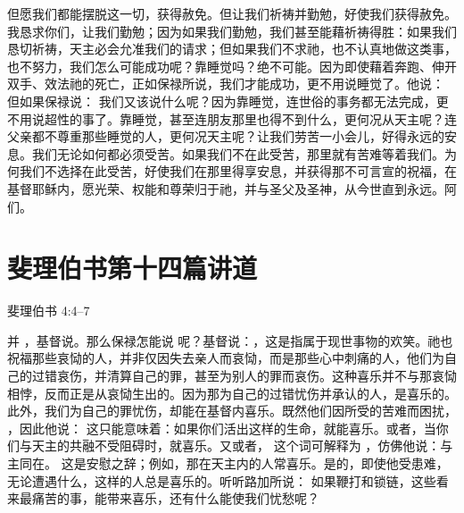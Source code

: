 但愿我们都能摆脱这一切，获得赦免。但让我们祈祷并勤勉，好使我们获得赦免。我恳求你们，让我们勤勉；因为如果我们勤勉，我们甚至能藉祈祷得胜：如果我们恳切祈祷，天主必会允准我们的请求；但如果我们不求祂，也不认真地做这类事，也不努力，我们怎么可能成功呢？靠睡觉吗？绝不可能。因为即使藉着奔跑、伸开双手、效法祂的死亡，正如保禄所说，我们才能成功，更不用说睡觉了。他说： 但如果保禄说： 我们又该说什么呢？因为靠睡觉，连世俗的事务都无法完成，更不用说超性的事了。靠睡觉，甚至连朋友那里也得不到什么，更何况从天主呢？连父亲都不尊重那些睡觉的人，更何况天主呢？让我们劳苦一小会儿，好得永远的安息。我们无论如何都必须受苦。如果我们不在此受苦，那里就有苦难等着我们。为何我们不选择在此受苦，好使我们在那里得享安息，并获得那不可言宣的祝福，在基督耶稣内，愿光荣、权能和尊荣归于祂，并与圣父及圣神，从今世直到永远。阿们。\par



\section{斐理伯书第十四篇讲道}

斐理伯书 4:4–7 \par

\par

 并  ，基督说。那么保禄怎能说  呢？基督说：，这是指属于现世事物的欢笑。祂也祝福那些哀恸的人，并非仅因失去亲人而哀恸，而是那些心中刺痛的人，他们为自己的过错哀伤，并清算自己的罪，甚至为别人的罪而哀伤。这种喜乐并不与那哀恸相悖，反而正是从哀恸生出的。因为那为自己的过错忧伤并承认的人，是喜乐的。此外，我们为自己的罪忧伤，却能在基督内喜乐。既然他们因所受的苦难而困扰， ，因此他说： 这只能意味着：如果你们活出这样的生命，就能喜乐。或者，当你们与天主的共融不受阻碍时，就喜乐。又或者， 这个词可解释为 ，仿佛他说：与主同在。 这是安慰之辞；例如，那在天主内的人常喜乐。是的，即使他受患难，无论遭遇什么，这样的人总是喜乐的。听听路加所说：  如果鞭打和锁链，这些看来最痛苦的事，能带来喜乐，还有什么能使我们忧愁呢？\par


